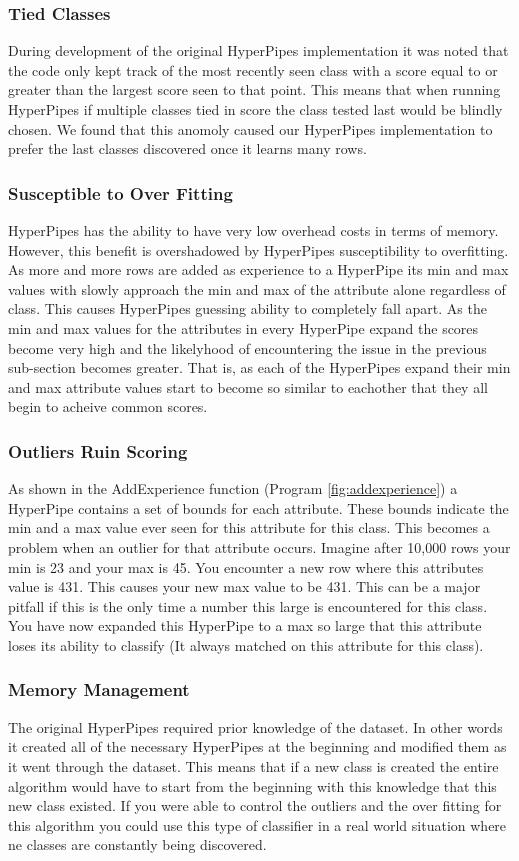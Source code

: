 \subsubsection{Tied Classes}
During development of the original HyperPipes implementation it was noted 
that the code only kept track of the most recently seen class with a score 
equal to or greater than the largest score seen to that point. This means
that when running HyperPipes if multiple classes tied in score the class
tested last would be blindly chosen. We found that this anomoly caused our 
HyperPipes implementation to prefer the last classes discovered once it 
learns many rows.
\subsubsection{Susceptible to Over Fitting}
HyperPipes has the ability to have very low overhead costs in terms of 
memory. However, this benefit is overshadowed by HyperPipes susceptibility 
to overfitting. As more and more rows are added as experience to a HyperPipe 
its min and max values with slowly approach the min and max of the attribute 
alone regardless of class. This causes HyperPipes guessing ability to 
completely fall apart. As the min and max values for the attributes in every
HyperPipe expand the scores become very high and the likelyhood of 
encountering the issue in the previous sub-section becomes greater. That is, 
as each of the HyperPipes expand their min and max attribute values start to 
become so similar to eachother that they all begin to acheive common scores.
\subsubsection{Outliers Ruin Scoring}
As shown in the AddExperience function (Program \ref{fig:addexperience}) a HyperPipe contains a set 
of bounds for each attribute. These bounds indicate the min and a max value 
ever seen for this attribute for this class. This becomes a problem when an 
outlier for that attribute occurs. Imagine after 10,000 rows your min is 23 
and your max is 45. You encounter a new row where this attributes value is 
431. This causes your new max value to be 431. This can be a major pitfall 
if this is the only time a number this large is encountered for this class. 
 You have now expanded this HyperPipe to a max so large that this attribute 
loses its ability to classify (It always matched on this attribute for this 
class).
\subsubsection{Memory Management}
The original HyperPipes required prior knowledge of the dataset. In other 
words it created all of the necessary HyperPipes at the beginning and 
modified them as it went through the dataset. This means that if a new class 
is created the entire algorithm would have to start from the beginning with 
this knowledge that this new class existed. If you were able to control the
outliers and the over fitting for this algorithm you could use this type of 
classifier in a real world situation where ne classes are constantly being 
discovered. 